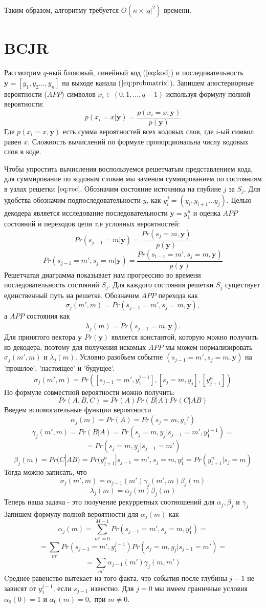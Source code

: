 \documentclass{ITaSconf}
\begin{document}
Таким образом, алгоритму требуется $O(n\times\left|{q}\right|^2)$ времени.

\section{BCJR}
\label{sec:vBCJR}

Рассмотрим $q$-ный блоковый, линейный код ($\ref{eq:kod}$) и последовательность $\mathbold{y}=[y_1,y_2...,y_n]$ на выходе канала ($\ref{eq:probmatrix}$). Запишем апостериорные вероятности ($APP$) символов $x_i \in ({0,1,...,q-1})$ используя формулу полной вероятности:
$$p(x_i=x|\mathbold{y})=\frac{p(x_i=x,\mathbold{y})}{p(\mathbold{y})}$$
Где $p(x_i=x,\mathbold{y})$ есть сумма вероятностей всех кодовых слов, где $i$-ый символ равен $x$. 
Сложность вычислений по формуле пропорциональна числу кодовых слов в коде. 

Чтобы упростить вычисления воспользуемся решетчатым представлением кода, для суммирование по кодовым словам мы заменим суммированием по состояниям в узлах решетки $\eqref{eq:rec}$. Обозначим состояние источника на глубине $j$ за $S_j$.
Для удобства обозначим подпоследовательности $y$, как $y_i^j=(y_i,y_{i+1}\dots y_j)$.
Целью декодера является исследование последовательности $\mathbold{y}=y_1^n$ и оценка $APP$ состояний и переходов цепи т.е условных вероятностей:
$$Pr(s_{j-1}=m|\mathbold{y})=\frac{Pr(s_j=m,\mathbold{y})}{p(\mathbold{y})}$$
$$Pr(s_{j-1}=m',s_j=m|\mathbold{y})=\frac{Pr(s_{t-1}=m',s_j=m,\mathbold{y})}{p(\mathbold{y})}$$
Решетчатая диаграмма показывает нам прогрессию во времени последовательность состояний $S_j$. Для каждого состояния решетки $S_j$ существует единственный путь на решетке.
Обозначим $APP$ перехода как
$$\sigma_j(m',m)=Pr(s_{j-1}=m',s_j=m,\mathbold{y}),$$
а $APP$ состояния как 
$$\lambda_j(m)=Pr(s_{j-1}=m,\mathbold{y}).$$
Для принятого вектора $\mathbold{y}$ $Pr(\mathbold{y})$ является константой, которую можно получить из декодера, поэтому для получения искомых $APP$ мы можем нормализировать $\sigma_j(m',m)$ и $\lambda_j(m)$.
Условно разобьем событие $(s_{j-1}=m',s_j=m,\mathbold{y})$ на 'прошлое', 'настоящее' и 'будущее'.
$$\sigma_j(m',m)=Pr([s_{j-1}=m',y_1^{j-1}],[s_j=m,y_j],[y_{j+1}^n])$$
По формуле совместной вероятности можно получить: 
$$Pr(A,B,C)=Pr(A)Pr(B|A)Pr(C|AB)$$
Введем вспомогательные функции вероятности
$$\alpha_j(m)=Pr(A)=Pr(s_j=m,{y_1}^j)$$
$$\gamma_j(m',m)=Pr(B|A)=Pr(s_j=m,y_j|s_{j-1}=m',y_1^{j-1})=$$$$=Pr(s_j=m,y_j|s_{j-1}=m')$$
$$\beta_j(m)=Pr(C|AB)=Pr(y^{n}_{j+1}|s_{j-1}=m',s_j=m,y^{j}_1=Pr(y_{t+1}^n|s_j=m)$$
Тогда можно записать, что 
$$\sigma_j(m',m)=\alpha_{j-1}(m')\gamma_j(m',m)\beta_j(m)$$
$$\lambda_j(m)=\alpha_j(m)\beta_j(m)$$
Теперь наша задача - это получение рекурретных соотношений для $\alpha_j,\beta_j$ и $\gamma_j$ 
Запишем формулу полной вероятности для $\alpha_j(m)$ как
$$\alpha_j(m)=\sum\limits_{m'=0}^{M-1}Pr(s_{j-1}= m',s_j=m,y_1^j)=$$$$=\sum\limits_{m'}Pr(s_{j-1}=m',y_1^{j-1})Pr(s_j=m,y_j|s_{j-1}=m')=$$$$=\sum\limits_{m'}\alpha_{j-1}(m')\gamma_j(m,m')$$
Cреднее равенство вытекает из того факта, что события после глубины $j-1$ не зависят от $y_1^{j-1}$, если $s_{j-1}$ известно. Для $j=0$ мы имеем граничные условия $ \alpha_0(0)=1$ и $\alpha_0(m)=0,$ при $m\neq0$.
\end{document}
